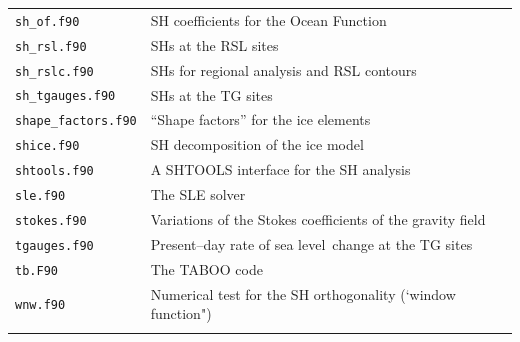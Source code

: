 \documentclass[11pt,fleqn,a4paper,titlepage]{article}
\newcommand\sealevel{sea level~}
\begin{document}
\begin{table}[!hbp]
\begin{center}
\begin{tabular}{ll}
\texttt{sh\_of.f90}& SH coefficients for the Ocean Function \\[-0.0em]
\texttt{sh\_rsl.f90}& SHs at the RSL sites \\[-0.0em]
\texttt{sh\_rslc.f90}& SHs for regional analysis and RSL contours  \\[-0.0em]
\texttt{sh\_tgauges.f90}& SHs at the TG sites  \\[-0.0em]
\texttt{shape\_factors.f90}& ``Shape factors'' for the ice elements \\[-0.0em]
\texttt{shice.f90}& SH decomposition of the ice model \\[-0.0em]
\texttt{shtools.f90}& A SHTOOLS interface for the SH analysis \\[-0.0em]
\texttt{sle.f90}& The SLE solver \\[-0.0em]
\texttt{stokes.f90}& Variations of the Stokes coefficients of the gravity field \\[-0.0em]
\texttt{tgauges.f90}& Present--day rate of \sealevel change at the TG sites \\[-0.0em]
\texttt{tb.F90}& The TABOO code \\[-0.0em]
\texttt{wnw.f90} &  Numerical test for the SH orthogonality (`window function")\\
\hline
\label{table:fortran-units}
\end{tabular}
\end{center}
\end{table}
\clearpage 
\end{document}
